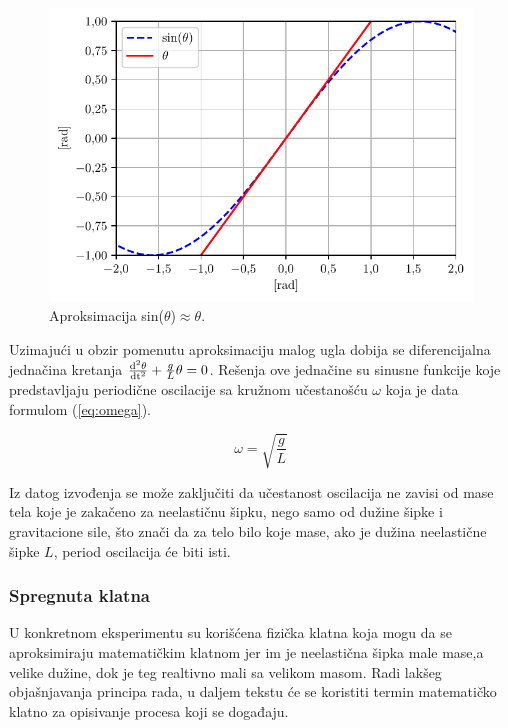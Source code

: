 \documentclass[a4paper, 12pt, diplomski]{etf}
\begin{document}
\begin{figure}[h!]
    \centering
    \includegraphics[scale=1]{py_teorija/theta_approx.pdf}
    \caption{Aproksimacija sin($\theta$)$\approx \theta$.}
    \label{theta_approx}
\end{figure}



\noindent
Uzimajući u obzir pomenutu aproksimaciju malog ugla dobija se diferencijalna jednačina kretanja $\frac{\rm{d}^2 \theta}{\rm{d}t^2} + \frac{g}{L}\theta = 0$. Rešenja ove jednačine su sinusne funkcije koje predstavljaju periodične oscilacije sa kružnom učestanošću $\omega$ koja je data formulom (\ref{eq:omega}).

\begin{equation}
\label{eq:omega}
\omega = \sqrt{\frac{g}{L}}
\end{equation}

\noindent
Iz datog izvođenja se može zaključiti da učestanost oscilacija ne zavisi od mase tela koje je zakačeno za neelastičnu šipku, nego samo od dužine šipke i gravitacione sile, što znači da za telo bilo koje mase, ako je dužina neelastične šipke $L$, period oscilacija će biti isti.





\subsubsection{Spregnuta klatna}

U konkretnom eksperimentu su korišćena fizička klatna koja mogu da se aproksimiraju matematičkim klatnom jer im je neelastična šipka male mase,a velike dužine, dok je teg realtivno mali sa velikom masom. Radi lakšeg objašnjavanja principa rada, u daljem tekstu će se koristiti termin matematičko klatno za opisivanje procesa koji se događaju. 
\end{document}
